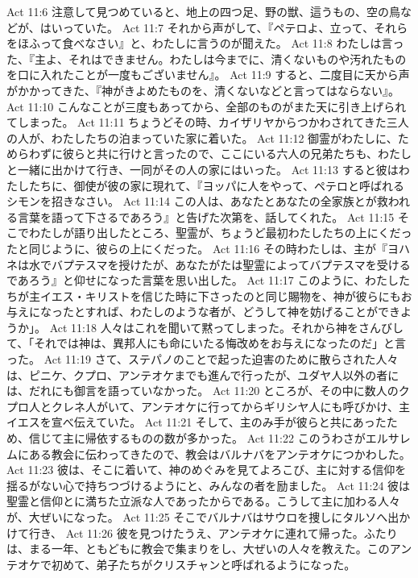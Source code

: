 Act 11:6  注意して見つめていると、地上の四つ足、野の獣、這うもの、空の鳥などが、はいっていた。
Act 11:7  それから声がして、『ペテロよ、立って、それらをほふって食べなさい』と、わたしに言うのが聞えた。
Act 11:8  わたしは言った、『主よ、それはできません。わたしは今までに、清くないものや汚れたものを口に入れたことが一度もございません』。
Act 11:9  すると、二度目に天から声がかかってきた、『神がきよめたものを、清くないなどと言ってはならない』。
Act 11:10  こんなことが三度もあってから、全部のものがまた天に引き上げられてしまった。
Act 11:11  ちょうどその時、カイザリヤからつかわされてきた三人の人が、わたしたちの泊まっていた家に着いた。
Act 11:12  御霊がわたしに、ためらわずに彼らと共に行けと言ったので、ここにいる六人の兄弟たちも、わたしと一緒に出かけて行き、一同がその人の家にはいった。
Act 11:13  すると彼はわたしたちに、御使が彼の家に現れて、『ヨッパに人をやって、ペテロと呼ばれるシモンを招きなさい。
Act 11:14  この人は、あなたとあなたの全家族とが救われる言葉を語って下さるであろう』と告げた次第を、話してくれた。
Act 11:15  そこでわたしが語り出したところ、聖霊が、ちょうど最初わたしたちの上にくだったと同じように、彼らの上にくだった。
Act 11:16  その時わたしは、主が『ヨハネは水でバプテスマを授けたが、あなたがたは聖霊によってバプテスマを受けるであろう』と仰せになった言葉を思い出した。
Act 11:17  このように、わたしたちが主イエス・キリストを信じた時に下さったのと同じ賜物を、神が彼らにもお与えになったとすれば、わたしのような者が、どうして神を妨げることができようか」。
Act 11:18  人々はこれを聞いて黙ってしまった。それから神をさんびして、「それでは神は、異邦人にも命にいたる悔改めをお与えになったのだ」と言った。
Act 11:19  さて、ステパノのことで起った迫害のために散らされた人々は、ピニケ、クプロ、アンテオケまでも進んで行ったが、ユダヤ人以外の者には、だれにも御言を語っていなかった。
Act 11:20  ところが、その中に数人のクプロ人とクレネ人がいて、アンテオケに行ってからギリシヤ人にも呼びかけ、主イエスを宣べ伝えていた。
Act 11:21  そして、主のみ手が彼らと共にあったため、信じて主に帰依するものの数が多かった。
Act 11:22  このうわさがエルサレムにある教会に伝わってきたので、教会はバルナバをアンテオケにつかわした。
Act 11:23  彼は、そこに着いて、神のめぐみを見てよろこび、主に対する信仰を揺るがない心で持ちつづけるようにと、みんなの者を励ました。
Act 11:24  彼は聖霊と信仰とに満ちた立派な人であったからである。こうして主に加わる人々が、大ぜいになった。
Act 11:25  そこでバルナバはサウロを捜しにタルソへ出かけて行き、
Act 11:26  彼を見つけたうえ、アンテオケに連れて帰った。ふたりは、まる一年、ともどもに教会で集まりをし、大ぜいの人々を教えた。このアンテオケで初めて、弟子たちがクリスチャンと呼ばれるようになった。
